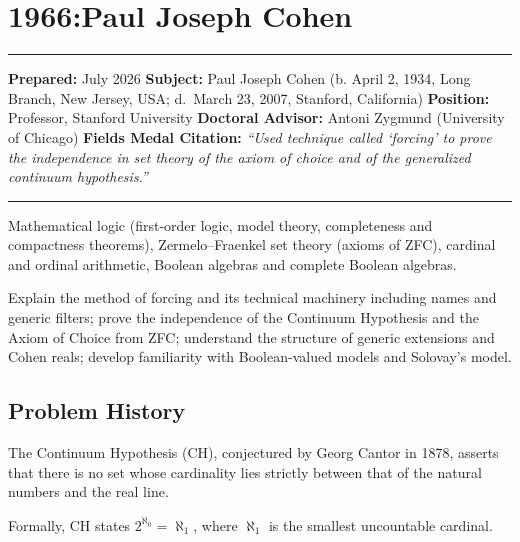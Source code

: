 \chapter{1966:Paul Joseph Cohen}
\label{ch1966pauljosephcohen:paul-joseph-cohen-fields-medal-1966-a-comprehensive-report}

\begin{center}\rule{0.5\linewidth}{0.5pt}\end{center}

\textbf{Prepared:} July 2026
\textbf{Subject:} Paul Joseph Cohen (b. April 2, 1934, Long Branch, New Jersey, USA; d.~March 23, 2007, Stanford, California)
\textbf{Position:} Professor, Stanford University
\textbf{Doctoral Advisor:} Antoni Zygmund (University of Chicago)
\textbf{Fields Medal Citation:} \emph{``Used technique called `forcing' to prove the independence in set theory of the axiom of choice and of the generalized continuum hypothesis.''}

\begin{center}\rule{0.5\linewidth}{0.5pt}\end{center}

\begin{prereqs}
Mathematical logic (first-order logic, model theory, completeness and compactness theorems), Zermelo--Fraenkel set theory (axioms of ZFC), cardinal and ordinal arithmetic, Boolean algebras and complete Boolean algebras.
\end{prereqs}

\begin{objectives}
Explain the method of forcing and its technical machinery including names and generic filters; prove the independence of the Continuum Hypothesis and the Axiom of Choice from ZFC; understand the structure of generic extensions and Cohen reals; develop familiarity with Boolean-valued models and Solovay's model.
\end{objectives}

\section{Problem History}

The Continuum Hypothesis (CH), conjectured by Georg Cantor in 1878, asserts that there is no set whose cardinality lies strictly between that of the natural numbers and the real line.

Formally, CH states $2^{\aleph_0} = \aleph_1$, where $\aleph_1$ is the smallest uncountable cardinal.


